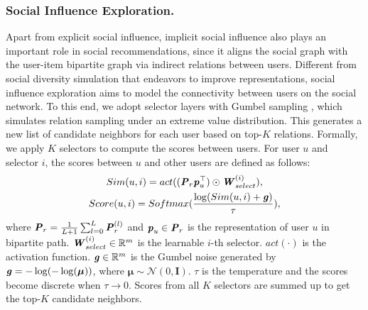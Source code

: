 \documentclass[letterpaper]{article} %
\begin{document}
\subsubsection{Social Influence Exploration.}
Apart from explicit social influence, implicit social influence also plays an important role in social recommendations, since it aligns the social graph with the user-item bipartite graph via indirect relations between users. Different from social diversity simulation that endeavors to improve representations, social influence exploration aims to model the connectivity between users on the social network. To this end, we adopt selector layers with Gumbel sampling \cite{gumbel,ESRF}, which simulates relation sampling under an extreme value distribution.
This generates a new list of candidate neighbors for each user based on top-$K$ relations. Formally, we apply $K$ selectors to compute the scores between users. For user $u$ and selector $i$, the scores between $u$ and other users are defined as follows:
\begin{gather}
    Sim(u, i) = act((\textbf{\textit{P}}_r \textbf{\textit{p}}_u^{\top})\odot \textbf{\textit{W}}_{select}^{(i)}),\\
    Score(u, i) = Softmax(\frac{\log(Sim(u, i)+\textbf{\textit{g}})}{\tau}),
\end{gather}
where $\textbf{\textit{P}}_{r}=\frac{1}{L+1}\sum_{l=0}^{L}{\textbf{\textit{P}}^{(l)}_r}$ and $\textbf{\textit{p}}_u \in \textbf{\textit{P}}_r$ is the representation of user $u$ in bipartite path. $\textbf{\textit{W}}_{select}^{(i)} \in \mathbb{R}^m$ is the learnable $i$-th selector. $act(\cdot)$ is the activation function. $\textbf{\textit{g}} \in \mathbb{R}^{m}$ is the Gumbel noise generated by $\textbf{\textit{g}}=-\log(-\log(\boldsymbol{\mu}))$, where $\boldsymbol{\mu} \sim \mathcal{N}(0,\textbf{I})$. $\tau$ is the temperature and the scores become discrete when $\tau \rightarrow 0$. Scores from all $K$ selectors are summed up to get the top-$K$ candidate neighbors.
\end{document}
